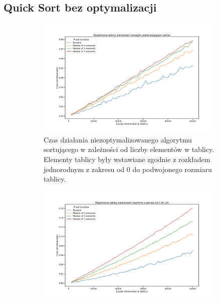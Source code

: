 \documentclass{article}
\begin{document}
    \subsection{Quick Sort bez optymalizacji}
    \begin{figure}
        \centering
        \begin{subfigure}[t]{0.47\textwidth}
            \centering
            \includegraphics[width=\linewidth]{ryciny/bez-optymalizacji/lineplot-random-fill-unoptimized.png}
            \caption{Czas działania niezoptymalizowanego algorytmu sortującego w zależności od liczby elementów w tablicy. Elementy tablicy były wstawiane zgodnie z rozkładem jednorodnym z zakresu od 0 do podwojonego rozmiaru tablicy.}
            \label{fig:unoptimized:random_fill}
        \end{subfigure}
        \hfill
        \begin{subfigure}[t]{0.47\textwidth}
            \centering
            \includegraphics[width=\linewidth]{ryciny/bez-optymalizacji/lineplot-100-fill-unoptimized.png}

\end{subfigure}
\end{figure}
\end{document}
